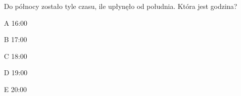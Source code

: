 \begin{tresc}
Do północy zostało tyle czasu, ile upłynęło od południa. Która jest godzina?
\end{tresc}
\begin{wariant}{A} 16:00 \end{wariant}
\begin{wariant}{B} 17:00 \end{wariant}
\begin{wariant}{C} 18:00 \end{wariant}
\begin{wariant}{D} 19:00 \end{wariant}
\begin{wariant}{E} 20:00 \end{wariant}
